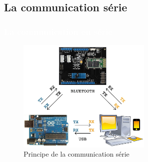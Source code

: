 \documentclass{beamer}
\begin{document}
\subsection{La communication série}
\begin{frame}
\frametitle{\textcolor{white}{La communication en série}}

\begin{figure}
\includegraphics[height=5.5cm]{images/rxtx.png}
\caption{Principe de la communication série}
\end{figure}
\end{frame}

\end{document}
